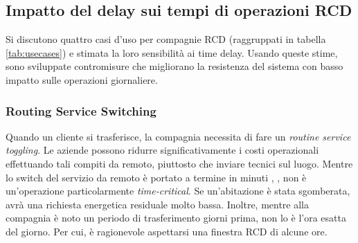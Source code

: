 \subsection{Impatto del delay sui tempi di operazioni RCD}
Si discutono quattro casi d'uso per compagnie RCD (raggruppati in tabella \ref{tab:usecases}) e stimata la loro sensibilità ai time delay. Usando queste stime, sono sviluppate contromisure che migliorano la resistenza del sistema con basso impatto sulle operazioni giornaliere.\\
\subsubsection{Routing Service Switching}
Quando un cliente si trasferisce, la compagnia necessita di fare un \emph{routine service toggling}. Le aziende possono ridurre significativamente i costi operazionali effettuando tali compiti da remoto, piuttosto che inviare tecnici sul luogo. Mentre lo switch del servizio da remoto è portato a termine in minuti \cite{toggle1}, \cite{toggle2}, non è un'operazione particolarmente \emph{time-critical}. Se un'abitazione è stata sgomberata, avrà una richiesta energetica residuale molto bassa. Inoltre, mentre alla compagnia è noto un periodo di trasferimento giorni prima, non lo è l'ora esatta del giorno. Per cui, è ragionevole aspettarsi una finestra RCD di alcune ore.
